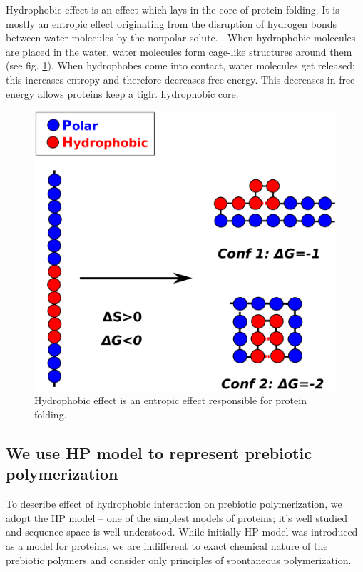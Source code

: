 \documentclass[journal=jacsat,manuscript=article,layout=twocolumn]{achemso}
\begin{document}
Hydrophobic effect is an effect which lays in the core of protein folding. It is mostly an 
entropic effect originating from the disruption of hydrogen bonds between water 
molecules by the nonpolar solute. \cite{Silverstein1998}. When hydrophobic molecules are placed in 
the water, water molecules form cage-like structures around them (see fig. \ref{fig:hydro-effect}). 
When hydrophobes come into contact, water molecules get released; this increases entropy and 
therefore decreases free energy. This decreases in free energy allows proteins keep a tight 
hydrophobic core.
\begin{figure}[h!]
  \centering
  \includegraphics[width=\columnwidth]{pictures/hp-model.pdf} 
  \caption{Hydrophobic effect is an entropic effect responsible for protein folding. }
  \label{fig:hydro-effect}
\end{figure}

\subsection{We use HP model to represent prebiotic polymerization}
To describe effect of hydrophobic interaction on prebiotic polymerization, we adopt the HP model 
-- one of the simplest models of proteins; it's well studied and sequence space is well 
understood\cite{lau1989lattice,Chan1991,Miller1995,Yue1995,agarwala1997local}. While initially HP 
model was introduced as a model for proteins, we are indifferent to exact chemical nature of the 
prebiotic polymers and consider only principles of spontaneous polymerization.
\end{document}
